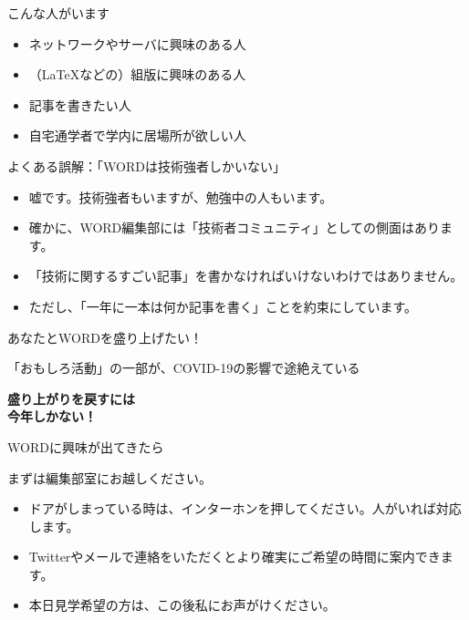 \documentclass[lualatex]{beamer}
\begin{document}
\begin{frame}[plain]{こんな人がいます}
 \begin{itemize}
  \item ネットワークやサーバに興味のある人
  \item （\LaTeX などの）組版に興味のある人
  \item 記事を書きたい人
  \item 自宅通学者で学内に居場所が欲しい人
 \end{itemize}
\end{frame}

\begin{frame}[plain]{よくある誤解：「WORDは技術強者しかいない」}
  \begin{itemize}
    \item 嘘です。技術強者もいますが、勉強中の人もいます。
    \item 確かに、WORD編集部には「技術者コミュニティ」としての側面はあります。
    \item 「技術に関するすごい記事」を書かなければいけないわけではありません。
    \item ただし、「一年に一本は何か記事を書く」ことを約束にしています。
  \end{itemize}
\end{frame}

\begin{frame}[plain]{あなたとWORDを盛り上げたい！} 
  \begin{center}
  「おもしろ活動」の一部が、COVID-19の影響で途絶えている

    { \Huge \textbf{盛り上がりを戻すには\\ 今年しかない！ }}
  \end{center}
\end{frame}

\begin{frame}[plain]{WORDに興味が出てきたら}
  
  \begin{center}
  まずは編集部室にお越しください。
  \end{center}

  \begin{itemize}
     \item ドアがしまっている時は、インターホンを押してください。人がいれば対応します。
     \item Twitterやメールで連絡をいただくとより確実にご希望の時間に案内できます。
    \item 本日見学希望の方は、この後私にお声がけください。
  \end{itemize}
\end{frame}
\end{document}
